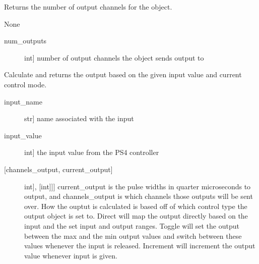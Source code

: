 \documentclass[letterpaper,10pt,english]{sphinxmanual}
\begin{document}
\begin{fulllineitems}
\begin{fulllineitems}
\label{\detokenize{specific:SideLipOutput.SideLipOutput.get_num_channels}}
\sphinxAtStartPar
Returns the number of output channels for the object.

\sphinxAtStartPar
{}

\sphinxAtStartPar
None

\sphinxAtStartPar
{}
\begin{description}
\item[{num\_outputs}] \leavevmode{[}int{]}
\sphinxAtStartPar
number of output channels the object sends output to

\end{description}

\end{fulllineitems}


\begin{fulllineitems}
\label{\detokenize{specific:SideLipOutput.SideLipOutput.get_output}}
\sphinxAtStartPar
Calculate and returns the output based on the given input value and current control mode.

\sphinxAtStartPar
{}
\begin{description}
\item[{input\_name}] \leavevmode{[}str{]}
\sphinxAtStartPar
name associated with the input

\item[{input\_value}] \leavevmode{[}int{]}
\sphinxAtStartPar
the input value from the PS4 controller

\end{description}

\sphinxAtStartPar
{}
\begin{description}
\item[{{[}channels\_output, current\_output{]}}] \leavevmode{[}{[}{[}int{]}, {[}int{]}{]}{]}
\sphinxAtStartPar
current\_output is the pulse widths in quarter microseconds to output, and channels\_output
is which channels those outputs will be sent over. How the ouptut is calculated is based
off of which control type the output object is set to. Direct will map the output directly
based on the input and the set input and output ranges. Toggle will set the output between
the max and the min output values and switch between these values whenever the input is
released. Increment will increment the output value whenever input is given.


\end{description}
\end{fulllineitems}
\end{fulllineitems}
\end{document}
